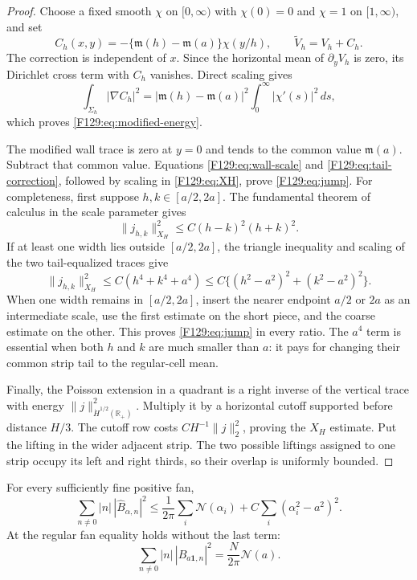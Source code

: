 \begin{proof}
Choose a fixed smooth \(\chi\) on \([0,\infty)\) with
\(\chi(0)=0\) and \(\chi=1\) on \([1,\infty)\), and set
\begin{equation}\label{F129:eq:tail-correction}
 C_h(x,y)=-\{\mathfrak m(h)-\mathfrak m(a)\}\chi(y/h),
 \qquad \widetilde V_h=V_h+C_h.
\end{equation}
The correction is independent of \(x\).  Since the horizontal mean of
\(\partial_yV_h\) is zero, its Dirichlet cross term with \(C_h\) vanishes.
Direct scaling gives
\begin{equation}
 \int_{\Sigma_h}|\nabla C_h|^2
 =|\mathfrak m(h)-\mathfrak m(a)|^2
   \int_0^\infty|\chi'(s)|^2\,ds,
\end{equation}
which proves \eqref{F129:eq:modified-energy}.

The modified wall trace is zero at \(y=0\) and tends to the common value
\(\mathfrak m(a)\).  Subtract that common value.  Equations
\eqref{F129:eq:wall-scale} and \eqref{F129:eq:tail-correction}, followed by scaling
in \eqref{F129:eq:XH}, prove \eqref{F129:eq:jump}.  For completeness, first suppose
\(h,k\in[a/2,2a]\).  The fundamental theorem of calculus in the scale
parameter gives
\[
 \|j_{h,k}\|_{X_H}^2\le C(h-k)^2(h+k)^2.
\]
If at least one width lies outside \([a/2,2a]\), the triangle inequality
and scaling of the two tail-equalized traces give
\[
 \|j_{h,k}\|_{X_H}^2
 \le C(h^4+k^4+a^4)
 \le C\{(h^2-a^2)^2+(k^2-a^2)^2\}.
\]
When one width remains in \([a/2,2a]\), insert the nearer endpoint
\(a/2\) or \(2a\) as an intermediate scale, use the first estimate on the
short piece, and the coarse estimate on the other.  This proves
\eqref{F129:eq:jump} in every ratio.  The \(a^4\) term is essential when both
\(h\) and \(k\) are much smaller than \(a\): it pays for changing their
common strip tail to the regular-cell mean.

Finally, the Poisson extension in a quadrant is a right inverse of the
vertical trace with energy
\(\|j\|_{\dot H^{1/2}(\mathbb R_+)}^2\).  Multiply it by a horizontal cutoff
supported before distance \(H/3\).  The cutoff row costs
\(CH^{-1}\|j\|_2^2\), proving the \(X_H\) estimate.  Put the lifting in the
wider adjacent strip.  The two possible liftings assigned to one strip
occupy its left and right thirds, so their overlap is uniformly bounded.
\end{proof}

\begin{proposition}\label{F129:prop:gluing}
For every sufficiently fine positive fan,
\begin{equation}\label{F129:eq:gluing}
 \sum_{n\ne0}|n|\,|\widehat B_{\alpha,n}|^2
 \le\frac1{2\pi}\sum_i\mathcal N(\alpha_i)
   +C\sum_i(\alpha_i^2-a^2)^2.
\end{equation}
At the regular fan equality holds without the last term:
\begin{equation}\label{F129:eq:uniform-strip}
 \sum_{n\ne0}|n|\,|\widehat B_{a\mathbf1,n}|^2
 =\frac N{2\pi}\mathcal N(a).
\end{equation}
\end{proposition}

